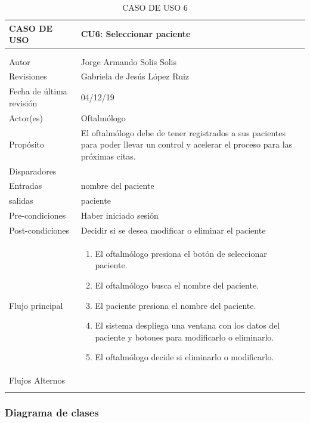 \documentclass[10pt]{article}
\begin{document}
\begin{longtable}{|p{3.8cm}|p{10.8cm}|}
\hline
CASO DE USO & CU6: Seleccionar paciente\\
\hline 
\endfirsthead

\hline

 & \\
\hline 
\endhead

\multicolumn{2}{c}{}
\endfoot

\endlastfoot
\hline
versión & 1\\
\hline
Autor & Jorge Armando Solis Solis\\
\hline
Revisiones & Gabriela de Jesús López Ruiz \\
\hline
Fecha de última revisión & 04/12/19\\
\hline
Actor(es) & Oftalmólogo \\
\hline
Propósito & El oftalmólogo debe de tener registrados a sus pacientes para poder llevar un control y acelerar el proceso para las próximas citas.\\
\hline
Disparadores & \\
\hline
Entradas & nombre del paciente\\
\hline
salidas & paciente\\
\hline
Pre-condiciones & Haber iniciado sesión\\
\hline
Post-condiciones & Decidir si se desea modificar o eliminar el paciente\\
\hline
Flujo principal & \begin{enumerate}
    \item El oftalmólogo presiona el botón de seleccionar paciente.
    \item El oftalmólogo busca el nombre del paciente.
    \item El paciente presiona el nombre del paciente.
    \item El sistema despliega una ventana con los datos del paciente y botones para modificarlo o eliminarlo.
    \item El oftalmólogo decide si eliminarlo o modificarlo.
\end{enumerate}
    \\
\hline
Flujos Alternos & \\
\hline
\caption{CASO DE USO 6}
\label{tabla1}
\end{longtable}

\subsubsection{Diagrama de clases}
\end{document}
